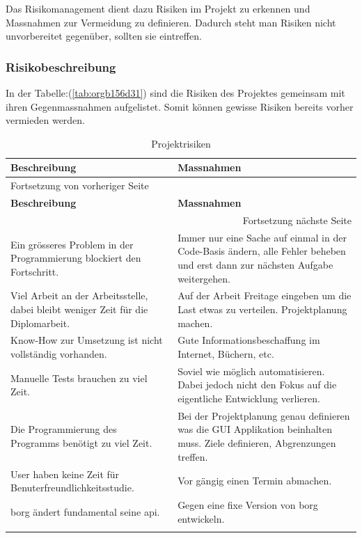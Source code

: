 Das Risikomanagement dient dazu Risiken im Projekt zu erkennen und Massnahmen
zur Vermeidung zu definieren. Dadurch steht man Risiken nicht
unvorbereitet gegenüber, sollten sie eintreffen.

\subsubsection{Risikobeschreibung}
\label{sec:org5fac90a}

In der Tabelle:(\ref{tab:orgb156d31}) sind die Risiken des Projektes
gemeinsam mit ihren Gegenmassnahmen aufgelistet. Somit können gewisse Risiken
bereits vorher vermieden werden.

\begin{longtable}{|p{}|p{}|}
\hline
\textbf{Beschreibung}\cellcolor[HTML]{C0C0C0} & \textbf{Massnahmen}\cellcolor[HTML]{C0C0C0}\\
\hline
\endfirsthead
\multicolumn{2}{l}{Fortsetzung von vorheriger Seite} \\
\hline

\textbf{Beschreibung}\cellcolor[HTML]{C0C0C0} & \textbf{Massnahmen}\cellcolor[HTML]{C0C0C0} \\

\hline
\endhead
\hline\multicolumn{2}{r}{Fortsetzung nächste Seite} \\
\endfoot
\endlastfoot
\hline
Ein grösseres Problem in der Programmierung blockiert den Fortschritt. & Immer nur eine Sache auf einmal in der Code-Basis ändern, alle Fehler beheben und erst dann zur nächsten Aufgabe weitergehen.\\
\hline
Viel Arbeit an der Arbeitsstelle, dabei bleibt weniger Zeit für die Diplomarbeit. & Auf der Arbeit Freitage eingeben um die Last etwas zu verteilen. Projektplanung machen.\\
\hline
Know-How zur Umsetzung ist nicht vollständig vorhanden. & Gute Informationsbeschaffung im Internet, Büchern, etc.\\
\hline
Manuelle Tests brauchen zu viel Zeit. & Soviel wie möglich automatisieren. Dabei jedoch nicht den Fokus auf die eigentliche Entwicklung verlieren.\\
\hline
Die Programmierung des Programms benötigt zu viel Zeit. & Bei der Projektplanung genau definieren was die GUI Applikation beinhalten muss. Ziele definieren, Abgrenzungen treffen.\\
\hline
User haben keine Zeit für Benuterfreundlichkeitsstudie. & Vor gängig einen Termin abmachen.\\
\hline
\gls{borg} ändert fundamental seine \gls{api}. & Gegen eine fixe Version von \gls{borg} entwickeln.\\
\hline
\caption{\label{tab:orge8eb370}
Projektrisiken}
\\
\end{longtable}

